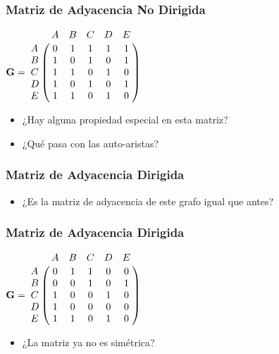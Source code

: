\documentclass[11pt]{beamer}
\begin{document}
\begin{frame}\frametitle{Matriz de Adyacencia No Dirigida}
\begin{center}
$
\mathbf{G} = 
    \bordermatrix{ 
        & A & B & C & D & E \cr
      A & 0 & 1 & 1 & 1 & 1 \cr
      B & 1 & 0 & 1 & 0 & 1 \cr
      C & 1 & 1 & 0 & 1 & 0 \cr
      D & 1 & 0 & 1 & 0 & 1 \cr
      E & 1 & 1 & 0 & 1 & 0 
      }
$
\end{center}
\pause
\begin{itemize}
\item ¿Hay alguna propiedad especial en esta matriz? 
\pause
\item ¿Qué pasa con las auto-aristas?
\end{itemize}
\end{frame}

\begin{frame}\frametitle{Matriz de Adyacencia Dirigida}
\begin{itemize}
\item ¿Es la matriz de adyacencia de este grafo igual que antes?
\end{itemize}
\begin{center}
\end{center}
\end{frame}

\begin{frame}\frametitle{Matriz de Adyacencia Dirigida}
\begin{center}
$
\mathbf{G} = 
    \bordermatrix{ 
        & A & B & C & D & E \cr
      A & 0 & 1 & 1 & 0 & 0 \cr
      B & 0 & 0 & 1 & 0 & 1 \cr
      C & 1 & 0 & 0 & 1 & 0 \cr
      D & 1 & 0 & 0 & 0 & 0 \cr
      E & 1 & 1 & 0 & 1 & 0 
      }
$
\end{center}
\pause
\begin{itemize}
\item ¿La matriz ya no es simétrica? 
\end{itemize}
\end{frame}
\end{document}
